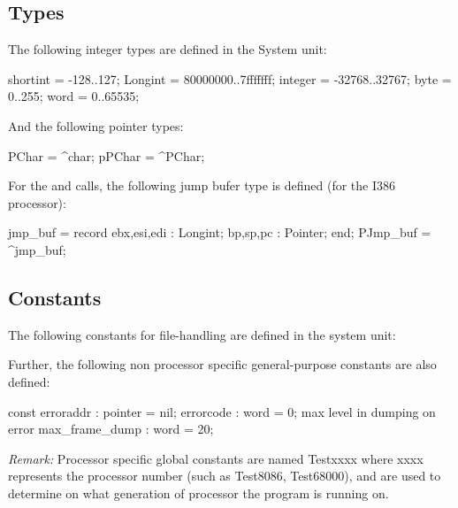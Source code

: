 \documentclass{report}
\begin{document}
\subsection{Types}
The following integer types are defined in the System unit:
\begin{listing}
shortint = -128..127;
Longint  = $80000000..$7fffffff;
integer  = -32768..32767;
byte     = 0..255;
word     = 0..65535;
\end{listing}
And the following pointer types:
\begin{listing}
  PChar = ^char;
  pPChar = ^PChar;
\end{listing}
For the  and  calls, the following jump bufer
type is defined (for the I386 processor): 
\begin{listing}
  jmp_buf = record
    ebx,esi,edi : Longint;
    bp,sp,pc : Pointer;
    end;
  PJmp_buf = ^jmp_buf;
\end{listing}
\subsection{Constants}
The following constants for file-handling are defined in the system unit:
Further, the following non processor specific general-purpose constants
are also defined:
\begin{listing} 
const
  erroraddr : pointer = nil;
  errorcode : word = 0;
 { max level in dumping on error }
  max_frame_dump : word = 20;
\end{listing}
\emph{ Remark: } Processor specific global constants are named Testxxxx
where xxxx represents the processor number (such as Test8086, Test68000),
and are used to determine on what generation of processor the program
is running on.
\end{document}
